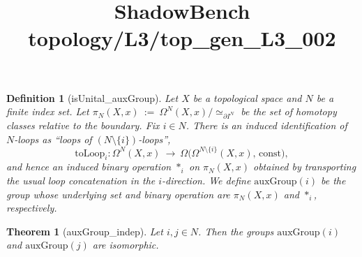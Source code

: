 \documentclass{article}
\title{ShadowBench topology/L3/top\_gen\_L3\_002}
\newtheorem{theorem}{Theorem}
\newtheorem{definition}{Definition}
\begin{document}
\maketitle

\begin{definition}[isUnital_auxGroup]
   Let $X$ be a topological space and $N$ be a finite index set.  
   Let $\pi_N(X,x)\ :=\ \Omega^{N}(X,x)\big/\simeq_{\partial I^N}$ be the set of homotopy classes relative to the boundary. Fix $i\in N$. There is an induced identification of $N$-loops as ``loops of $(N\setminus\{i\})$-loops'',
\[
\mathrm{toLoop}_i : \Omega^{N}(X,x)\ \longrightarrow\ \Omega\!\bigl(\Omega^{N\setminus\{i\}}(X,x),\,\mathrm{const}\bigr),
\]
and hence an induced binary operation $\ast_i$  on $\pi_N(X,x)$ obtained by transporting the usual loop
concatenation in the $i$-direction. We define $\mathrm{auxGroup}(i)$ be the group whose underlying set and binary operation are $\pi_N(X,x)$ and $\ast_i$, respectively.
\end{definition}


\begin{theorem}[auxGroup_indep]
Let $i,j\in N$. Then the groups $\mathrm{auxGroup}(i)$ and $\mathrm{auxGroup}(j)$ are isomorphic.
\end{theorem}
\end{document}
